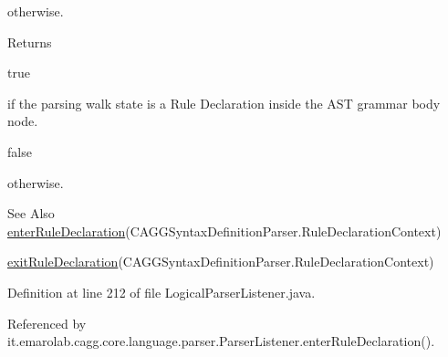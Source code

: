  otherwise. \begin{DoxyReturn}{Returns}

\begin{DoxyCode}
\textcolor{keyword}{true} 
\end{DoxyCode}
 if the parsing walk state is a Rule Declaration inside the A\-S\-T grammar body node.
\begin{DoxyCode}
\textcolor{keyword}{false} 
\end{DoxyCode}
 otherwise. 
\end{DoxyReturn}
\begin{DoxySeeAlso}{See Also}
\hyperlink{classit_1_1emarolab_1_1cagg_1_1core_1_1language_1_1parser_1_1ANTLRInterface_1_1LogicalParserListener_a2fab3cd21aefb1d5c46d0e7d6e8a5823}{enter\-Rule\-Declaration}(C\-A\-G\-G\-Syntax\-Definition\-Parser.\-Rule\-Declaration\-Context) 

\hyperlink{classit_1_1emarolab_1_1cagg_1_1core_1_1language_1_1parser_1_1ANTLRInterface_1_1LogicalParserListener_a5f03a5b07ffb03e5a41d18fca8860eb8}{exit\-Rule\-Declaration}(C\-A\-G\-G\-Syntax\-Definition\-Parser.\-Rule\-Declaration\-Context) 
\end{DoxySeeAlso}


Definition at line 212 of file Logical\-Parser\-Listener.\-java.



Referenced by it.\-emarolab.\-cagg.\-core.\-language.\-parser.\-Parser\-Listener.\-enter\-Rule\-Declaration().

